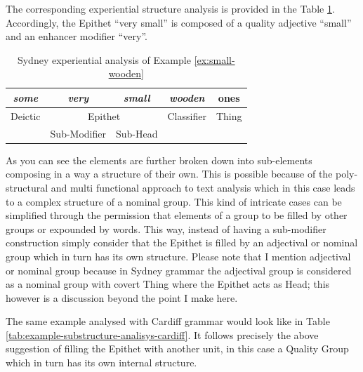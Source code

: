 The corresponding experiential structure analysis is provided in the Table \ref{tab:example-substructure-analisys}. Accordingly, the Epithet ``very small'' is composed of a quality adjective ``small'' and an enhancer modifier ``very''. 
 
\begin{table}[!ht]
    \centering
    \begin{tabular}{c|c|c|cc}
        \hline
        \multicolumn{1}{|c|}{\textit{some}}    & \textit{very}            & \textit{small}      & \multicolumn{1}{c|}{\textit{wooden}}     & \multicolumn{1}{c|}{ones}  \\ \hline
        \multicolumn{1}{|c|}{Deictic} & \multicolumn{2}{c|}{Epithet} & \multicolumn{1}{c|}{Classifier} & \multicolumn{1}{c|}{Thing} \\ \hline
        & Sub-Modifier  & Sub-Head   & \multicolumn{2}{c}{}                                         \\ \cline{2-3}
    \end{tabular}
    \caption{Sydney experiential analysis of Example \ref{ex:small-wooden}}
    \label{tab:example-substructure-analisys}
\end{table}

As you can see the elements are further broken down into sub-elements composing in a way a structure of their own. This is possible because of the poly-structural and multi functional approach to text analysis which in this case leads to a complex structure of a nominal group. This kind of intricate cases can be simplified through the permission that elements of a group to be filled by other groups or expounded by words. This way, instead of having a sub-modifier construction simply consider that the Epithet is filled by an adjectival or nominal group which in turn has its own structure. Please note that I mention adjectival or nominal group because in Sydney grammar the adjectival group is considered as a nominal group with covert Thing where the Epithet acts as Head; this however is a discussion beyond the point I make here. 

The same example analysed with Cardiff grammar would look like in Table \ref{tab:example-substructure-analisys-cardiff}. It follows precisely the above suggestion of filling the Epithet with another unit, in this case a Quality Group which in turn has its own internal structure. 

